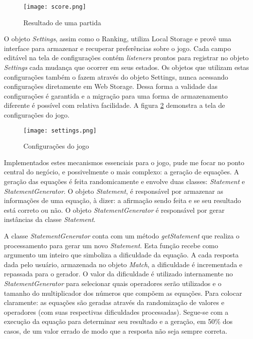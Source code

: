 \begin{figure}[H]
    \centering
    \texttt{[image: score.png]}
	\caption{Resultado de uma partida}
    \label{fig:placar}
\end{figure}

O objeto \textit{Settings}, assim como o Ranking, utiliza Local Storage
e provê uma interface para armazenar e recuperar preferências sobre
o jogo. Cada campo editável na tela de configurações contém
\textit{listeners} prontos para registrar no objeto \textit{Settings}
cada mudança que ocorrer em seus estados. Os objetos que utilizam estas
configurações também o fazem através do objeto Settings, nunca
acessando configurações diretamente em Web Storage. Dessa forma a
validade das configurações é garantida e a migração para uma forma
de armazenamento diferente é possível com relativa facilidade.
A figura \ref{fig:configurations} demonstra a tela de configurações do 
jogo.

\begin{figure}[H]
    \centering
    \texttt{[image: settings.png]}
	\caption{Configurações do jogo}
    \label{fig:configurations}
\end{figure}

Implementados estes mecanismos essenciais para o jogo, pude me focar no
ponto central do negócio, e possivelmente o mais complexo: a geração
de equações. A geração das equações é feita randomicamente e
envolve duas classes: \textit{Statement} e \textit{StatementGenerator}.
O objeto \textit{Statement}, é responsável por armazenar as
informações de uma equação, à dizer: a afirmação sendo feita
e se seu resultado está correto ou não.
O objeto \textit{StatementGenerator} é responsável por gerar
instâncias da classe \textit{Statement}.

A classe \textit{StatementGenerator} conta com um método
\textit{getStatement} que realiza o processamento para gerar um novo
\textit{Statement}. Esta função recebe como argumento um inteiro que
simboliza a dificuldade da equação. A cada resposta dada pelo usuário,
armazenada no objeto \textit{Match}, a dificuldade é incrementada
e repassada para o gerador. O valor da dificuldade é utilizado
internamente no \textit{StatementGenerator} para selecionar quais
operadores serão utilizados e o tamanho do multiplicador dos números
que compõem as equações. Para colocar claramente: as equações
são geradas através da randomização de valores e operadores (com
suas respectivas dificuldades processadas). Segue-se com a execução da
equação para determinar seu resultado e a geração, em 50\% dos
casos, de um valor errado de modo que a resposta não seja sempre
correta.

